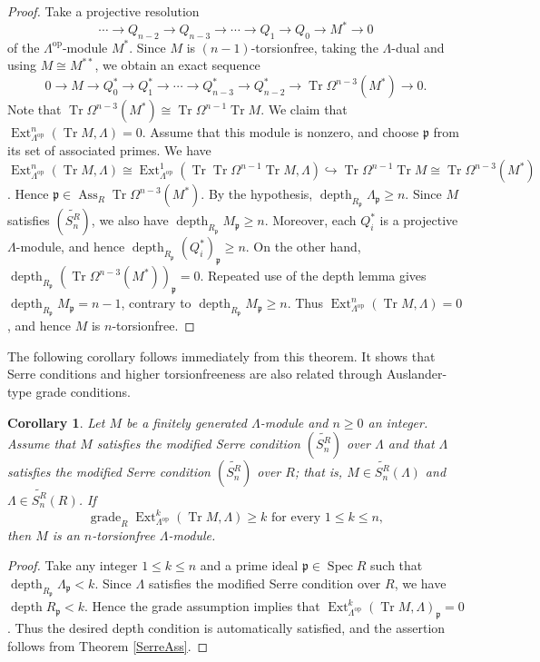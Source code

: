 \documentclass{amsart}
\newtheorem{cor}[thm]{Corollary}
\theoremstyle{definition}
\theoremstyle{remark}
\numberwithin{equation}{thm}
\def\ass{\operatorname{Ass}}
\def\depth{\operatorname{depth}}
\def\Ext{\operatorname{Ext}}
\def\ge{\geqslant}
\def\grade{\operatorname{grade}}
\def\le{\leqslant}
\def\p{\mathfrak{p}}
\def\spec{\operatorname{Spec}}
\def\syz{\Omega}
\def\tr{\operatorname{Tr}}
\begin{document}
\begin{proof}
Take a projective resolution
$$\cdots\to Q_{n-2}\to Q_{n-3}\to\cdots\to Q_1\to Q_0\to M^\ast\to0$$
of the $\Lambda^{\mathrm{op}}$-module $M^\ast$.
Since $M$ is $(n-1)$-torsionfree, taking the $\Lambda$-dual and using $M\cong M^{\ast\ast}$, we obtain an exact sequence
$$0\to M\to Q_0^\ast\to Q_1^\ast\to\cdots\to Q_{n-3}^\ast\to Q_{n-2}^\ast\to\tr\syz^{n-3}(M^\ast)\to0.$$
Note that $\tr\syz^{n-3}(M^\ast)\cong\tr\syz^{n-1}\tr M$.
We claim that $\Ext^n_{\Lambda^{\mathrm{op}}}(\tr M,\Lambda)=0$. Assume that this module is nonzero, and choose $\p$ from its set of associated primes.
We have $\Ext^n_{\Lambda^{\mathrm{op}}}(\tr M,\Lambda)\cong\Ext^1_{\Lambda^{\mathrm{op}}}(\tr\tr\syz^{n-1}\tr M,\Lambda)\hookrightarrow\tr\syz^{n-1}\tr M\cong\tr\syz^{n-3}(M^\ast)$.
Hence $\p\in\ass_R\tr\syz^{n-3}(M^\ast)$.
By the hypothesis, $\depth_{R_\p}\Lambda_\p\ge n$. Since $M$ satisfies $(\widetilde{S_n^R})$, we also have $\depth_{R_\p}M_\p\ge n$.
Moreover, each $Q_i^\ast$ is a projective $\Lambda$-module, and hence $\depth_{R_\p}(Q_i^\ast)_\p\ge n$.
On the other hand, $\depth_{R_\p}(\tr\syz^{n-3}(M^\ast))_\p=0$.
Repeated use of the depth lemma gives $\depth_{R_\p}M_\p=n-1$, contrary to $\depth_{R_\p}M_\p\ge n$.
Thus $\Ext^n_{\Lambda^{\mathrm{op}}}(\tr M,\Lambda)=0$, and hence $M$ is $n$-torsionfree.
\end{proof}

The following corollary follows immediately from this theorem. It shows that Serre conditions and higher torsionfreeness are also related through Auslander-type grade conditions.

\begin{cor}\label{Serregrade}
Let $M$ be a finitely generated $\Lambda$-module and $n\ge0$ an integer.
Assume that $M$ satisfies the modified Serre condition $(\widetilde{S_n^R})$ over $\Lambda$ and that $\Lambda$
satisfies the modified Serre condition $(\widetilde{S_n^R})$ over $R$; that is, $M\in\widetilde{S_n^R}(\Lambda)$ and
$\Lambda\in\widetilde{S_n^R}(R)$.
If $$\grade_R\Ext^k_{\Lambda^{\mathrm{op}}}(\tr M,\Lambda)\ge k \text{ for every }1\le k\le n,$$ then $M$ is an $n$-torsionfree $\Lambda$-module.
\end{cor}

\begin{proof}
Take any integer $1\le k\le n$ and a prime ideal $\p\in\spec R$ such that $\depth_{R_\p}\Lambda_\p<k$.
Since $\Lambda$ satisfies the modified Serre condition over $R$, we have $\depth R_\p<k$.
Hence the grade assumption implies that $\Ext^k_{\Lambda^{\mathrm{op}}}(\tr M,\Lambda)_\p=0$.
Thus the desired depth condition is automatically satisfied, and the assertion follows from Theorem \ref{SerreAss}.
\end{proof}
\end{document}
